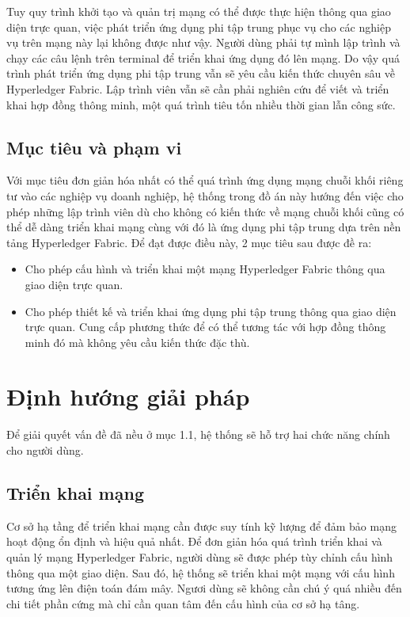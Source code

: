 \documentclass[../DoAn.tex]{subfiles}
\begin{document}
Tuy quy trình khởi tạo và quản trị mạng có thể được thực hiện thông qua giao diện trực quan, việc phát triển ứng dụng phi tập trung phục vụ cho các nghiệp vụ trên mạng này lại không được như vậy. Người dùng phải tự mình lập trình và chạy các câu lệnh trên terminal để triển khai ứng dụng đó lên mạng. Do vậy quá trình phát triển ứng dụng phi tập trung vẫn sẽ yêu cầu kiến thức chuyên sâu về Hyperledger Fabric. Lập trình viên vẫn sẽ cần phải nghiên cứu để viết và triển khai hợp đồng thông minh, một quá trình tiêu tốn nhiều thời gian lẫn công sức.

\subsection{Mục tiêu và phạm vi}

Với mục tiêu đơn giản hóa nhất có thể quá trình ứng dụng mạng chuỗi khối riêng tư vào các nghiệp vụ doanh nghiệp, hệ thống trong đồ án này hướng đến việc cho phép những lập trình viên dù cho không có kiến thức về mạng chuỗi khối cũng có thể dễ dàng triển khai mạng cùng với đó là ứng dụng phi tập trung dựa trên nền tảng Hyperledger Fabric. Để đạt được điều này, 2 mục tiêu sau được đề ra:
\begin{itemize}
	\item Cho phép cấu hình và triển khai một mạng Hyperledger Fabric thông qua giao diện trực quan.
	\item Cho phép thiết kế và triển khai ứng dụng phi tập trung thông qua giao diện trực quan. Cung cấp phương thức để có thể tương tác với hợp đồng thông minh đó mà không yêu cầu kiến thức đặc thù.
\end{itemize}

\section{Định hướng giải pháp}
\label{section:1.3}

Để giải quyết vấn đề đã nều ở mục 1.1, hệ thống sẽ hỗ trợ hai chức năng chính cho người dùng.

\subsection{Triển khai mạng}
Cơ sở hạ tầng để triển khai mạng cần được suy tính kỹ lượng để đảm bảo mạng hoạt động ổn định và hiệu quả nhất. Để đơn giản hóa quá trình triển khai và quản lý mạng Hyperledger Fabric, người dùng sẽ được phép tùy chỉnh cấu hình thông qua một giao diện. Sau đó, hệ thống sẽ triển khai một mạng với cấu hình tương ứng lên điện toán đám mây. Ngươi dùng sẽ không cần chú ý quá nhiều đến chi tiết phần cứng mà chỉ cần quan tâm đến cấu hình của cơ sở hạ tâng. 
\end{document}
